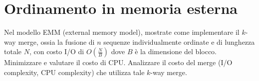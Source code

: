\chapter{Ordinamento in memoria esterna}

\begin{problem*}
    Nel modello EMM (external memory model), mostrate come implementare il
    \(k\)-way merge, ossia la fusione di \(n\) sequenze individualmente
    ordinate e di lunghezza totale \(N\), con costo I/O di \(O(\frac{N}{B})\)
    dove \(B\) \`e la dimensione del blocco. Minimizzare e valutare il costo
    di CPU. Analizzare il costo del merge (I/O complexity, CPU complexity)
    che utilizza tale \(k\)-way merge.
\end{problem*}
